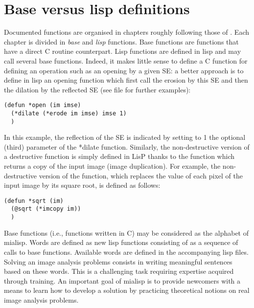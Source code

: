 \documentclass{book}
\renewcommand{\SE}{{SE}}
\begin{document}
\section{Base versus lisp definitions}
Documented functions are organised in chapters roughly following those of \citep{soille99,soille2004sv}.  Each chapter is divided in {\em base\/} and {\em lisp\/} functions.  Base functions are functions that have a direct C routine counterpart.  Lisp functions are defined in lisp and may call several base functions.  Indeed, it makes little sense to define a C function for defining an operation such as an opening by a given {\SE}: a better approach is to define in lisp an opening function which first call the erosion by this {\SE} and then the dilation by the reflected {\SE} (see file   for further examples):
\begin{verbatim}
(defun *open (im imse)
  (*dilate (*erode im imse) imse 1)
  )
\end{verbatim}
In this example, the reflection of the {\SE} is indicated by setting to 1 the optional (third) parameter of the *dilate function.  Similarly, the non-destructive version of a destructive function is simply defined in LisP thanks to the  function which returns a copy of the input image (image duplication).  For example, the non-destructive version of the  function, which replaces the value of each pixel of the input image by its square root, is defined as follows:
\begin{verbatim}
(defun *sqrt (im)
  (@sqrt (*imcopy im))
  )
\end{verbatim}

Base functions (i.e., functions written in C) may be considered as the alphabet of mialisp.  Words are defined as new lisp functions consisting of as a sequence of calls to base functions.  Available words are defined in the accompanying lisp files.  Solving an image analysis problems consists in writing meaningful sentences based on these words. This is a challenging task requiring expertise acquired through training.  An important goal of mialisp is to provide newcomers with a means to learn how to develop a solution by practicing theoretical notions on real image analysis problems.

\end{document}
